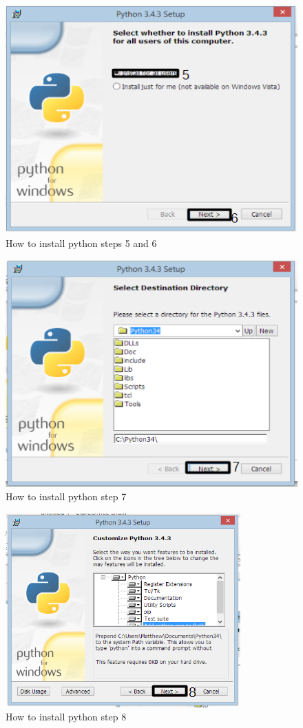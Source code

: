 \begin{enumerate}
\begin{figure}[H]
	\includegraphics{./manual/images/python-installation-instructions-3.png}
	\caption{How to install python steps 5 and 6}
\end{figure}

\begin{figure}[H]
	\includegraphics{./manual/images/python-installation-instructions-4.png}
	\caption{How to install python step 7}
\end{figure}

\begin{figure}[H]
	\includegraphics{./manual/images/python-installation-instructions-5.png}
	\caption{How to install python step 8}
\end{figure}


\end{enumerate}
